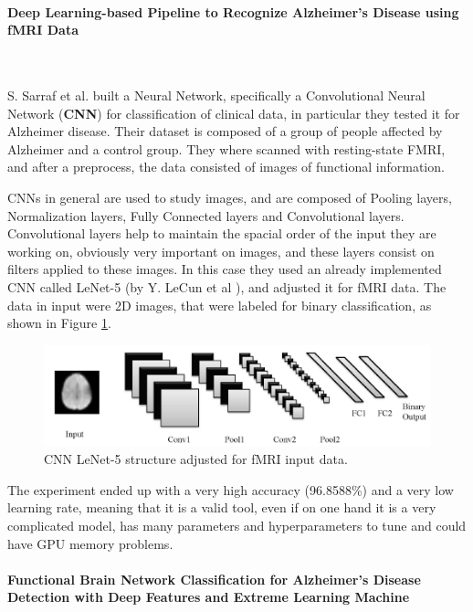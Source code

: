 \paragraph{Deep Learning-based Pipeline to Recognize Alzheimer’s Disease using fMRI Data}\
\vspace{0.5cm}

S. Sarraf et al. \cite{Sarraf066910} built a Neural Network, specifically a Convolutional Neural Network (\textbf{CNN}) for classification of clinical data, in particular they tested it for Alzheimer disease. Their dataset is composed of a group of people affected by Alzheimer and a control group. They where scanned with resting-state FMRI, and after a preprocess, the data consisted of images of functional information. 
\vspace{0.5cm}

CNNs in general are used to study images, and are composed of Pooling layers, Normalization layers, Fully Connected layers and Convolutional layers. Convolutional layers help to maintain the spacial order of the input they are working on, obviously very important on images, and these layers consist on filters applied to these images. In this case they used an already implemented CNN called LeNet-5 (by Y. LeCun et al \cite{726791}), and adjusted it for fMRI data. The data in input were 2D images, that were labeled for binary classification, as shown in Figure \ref{fig:diagram7}.
\vspace{0.5cm}

\begin{figure}[htbp]
	\centering
	\includegraphics[scale=1]{Immagini/deep-learning1.PNG}
	\caption{CNN LeNet-5 structure adjusted for fMRI input data.}
	\label{fig:diagram7}
\end{figure}

The experiment ended up with a very high accuracy (96.8588\%) and a very low learning rate, meaning that it is a valid tool, even if on one hand it is a very complicated model, has many parameters and hyperparameters to tune and could have GPU memory problems.

\paragraph{Functional Brain Network Classification for Alzheimer’s Disease Detection with Deep Features and Extreme Learning Machine}\
\vspace{0.5cm}

